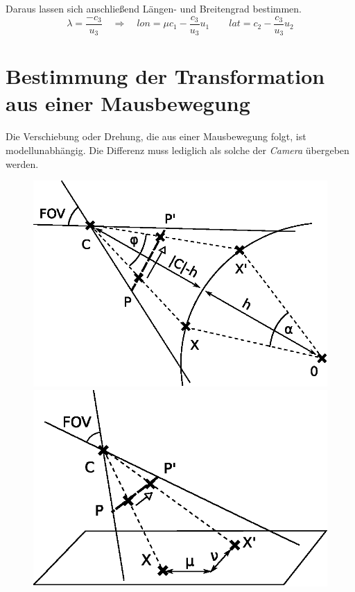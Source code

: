 \documentclass[10pt]{scrreprt}
\begin{document}
\vspace{2mm}
Daraus lassen sich anschließend Längen- und Breitengrad bestimmen.
\[
\lambda=\frac{-c_3}{u_3}\quad\Rightarrow\quad lon = \mu c_1-\frac{c_3}{u_3}u_1\quad\quad lat=c_2-\frac{c_3}{u_3}u_2
\]

\section{Bestimmung der Transformation aus einer Mausbewegung}

Die Verschiebung oder Drehung, die aus einer Mausbewegung folgt, ist modellunabhängig. Die Differenz muss lediglich als solche der \textit{Camera} übergeben werden.

\begin{figure}[!htb]
\begin{minipage}[l]{7.5cm}
\flushleft
\includegraphics[scale=0.75]{algo/MausKugel.eps}
\end{minipage}
\begin{minipage}[r]{7.5cm}
\flushright
\includegraphics[scale=0.75]{algo/MausEbene.eps}
\end{minipage}
\end{figure}
\end{document}
